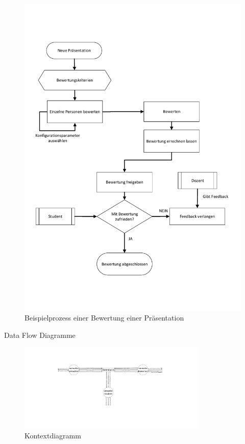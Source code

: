 \documentclass[a4paper,listof=leveldown,listof=numbered]{scrreprt}
\begin{document}
	\begin{figure}
		\centering
		\includegraphics[height=0.8\textheight]{../Diagramme/Beispiel-FlussdiagrPraesi.pdf}
		\caption{Beispielprozess einer Bewertung einer Präsentation}
	\end{figure}
	Data Flow Diagramme
	\begin{figure}
		\centering
		\includegraphics[width=0.8\textwidth]{../Diagramme/Kontextdiagramm_DFD0.pdf}
		\caption{Kontextdiagramm}
	\end{figure}
\end{document}
